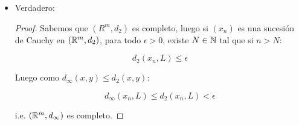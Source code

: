\begin{itemize}[label={✎},leftmargin=*]
    \item Verdadero:\\

    \begin{proof}
        Sabemos que $(R^m,d_2)$ es completo, luego si $(x_n)$ es una sucesión de Cauchy en $(\mathbb{R}^m,d_2)$, para todo $\epsilon>0$, existe $N\in \mathbb{N}$ tal que si $n>N$:

        $$d_2(x_n,L)\leq \epsilon$$

        Luego como $d_{\infty}(x,y)\leq d_2(x,y)$:

        $$d_{\infty}(x_n,L)\leq d_2(x_n,L)<\epsilon$$

        i.e. $(\mathbb{R}^m,d_{\infty})$ es completo.
    \end{proof}
\end{itemize}

